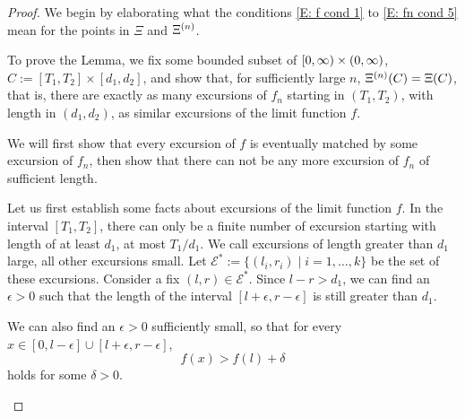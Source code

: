 \begin{proof}
We begin by elaborating what the conditions
\eqref{E: f cond 1} to \eqref{E: fn cond 5}
mean for the points in
$\Xi$ and $\Xi^{(n)}$.

To prove the Lemma, 
we fix some bounded subset of
$[0, \infty) \times (0, \infty)$,
$C := [T_1, T_2] \times [d_1, d_2]$,
and show that, for sufficiently large $n$,
$\Xi^{(n)}(C) = \Xi(C)$,
that is,
there are exactly as many excursions of $f_n$ starting in
$(T_1, T_2)$, 
with length in $(d_1, d_2)$,
as similar excursions of the limit function $f$.

We will first show that every excursion of $f$ is eventually matched by some excursion of $f_n$,
then show that there can not be any more excursion of $f_n$ of sufficient length.


\begin{proofpart}
Let us first establish some facts about excursions of the limit function $f$.
In the interval $[T_1, T_2]$,
there can only be a finite number of excursion starting with length of at least $d_1$,
at most $T_1/d_1$.
We call excursions of length greater than $d_1$ large, all other excursions small.
Let
$ \mathcal{E}^* := \{ (l_i, r_i) \; | \; i=1, \dots, k \} $
be the set of these excursions.
Consider a fix
$(l,r) \in \mathcal{E}^*$.
Since $l-r > d_1$,
we can find an $\epsilon > 0$
such that the length of the interval
$[l+\epsilon, r-\epsilon]$
is still greater than $d_1$.

We can also find an $\epsilon > 0$ sufficiently small,
so that for every
$x \in [0, l-\epsilon] \cup [l+\epsilon, r-\epsilon]$,
\begin{equation} \label{E: fx > fl + delta}
f(x) > f(l) + \delta
\end{equation}
holds for some $\delta > 0$.


\end{proofpart}
\end{proof}
